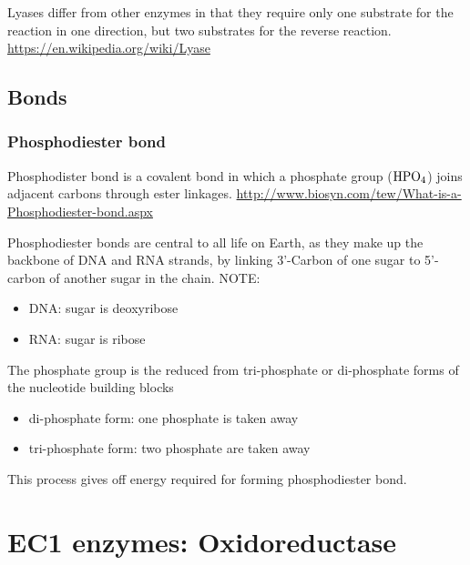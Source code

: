Lyases differ from other enzymes in that they require only one substrate for the
reaction in one direction, but two substrates for the reverse reaction.
\url{https://en.wikipedia.org/wiki/Lyase}

\section{Bonds}

\subsection{Phosphodiester bond}
\label{sec:phosphodiester-bond}

Phosphodister bond  is a covalent bond in which a phosphate group
($\ce{HPO_4}$) joins adjacent carbons through ester linkages.
\url{http://www.biosyn.com/tew/What-is-a-Phosphodiester-bond.aspx}

Phosphodiester bonds are central to all life on Earth, as they make up the
backbone of DNA and RNA strands, by linking 3'-Carbon of one sugar to 5'-carbon
of another sugar in the chain. NOTE: 
\begin{itemize}
  \item DNA: sugar is deoxyribose
  \item RNA: sugar is ribose
\end{itemize}

The phosphate group is the reduced from tri-phosphate or di-phosphate forms of
the nucleotide building blocks
\begin{itemize}
  \item di-phosphate form: one phosphate is taken away
  \item tri-phosphate form: two phosphate are taken away
\end{itemize}
This process gives off energy required for forming phosphodiester bond. 



\chapter{EC1 enzymes: Oxidoreductase}
\label{sec:oxidoreductase}

